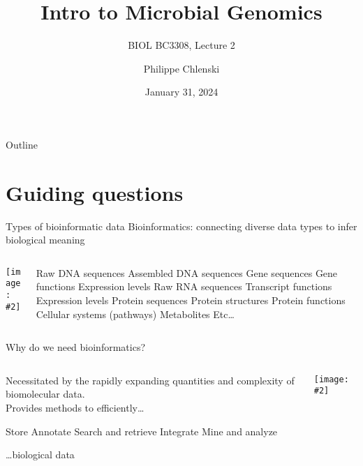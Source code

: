 \documentclass{beamer}
\title{Intro to Microbial Genomics}
\subtitle{BIOL BC3308, Lecture 2}
\author{Philippe Chlenski}
\date{January 31, 2024}
\renewcommand{\c}[1]{\begin{center}#1\end{center}}
\newcommand{\gr}[2][.95]{\c{\texttt{[image: \#2]}}}
\begin{document}
\begin{frame}[plain]
\titlepage
\end{frame}

\begin{frame}{Outline}
\tableofcontents
\end{frame}

\section{Guiding questions}

\begin{frame}{Types of bioinformatic data}
Bioinformatics: connecting diverse data types to infer biological meaning
\begin{columns}
\begin{column}{0.5\textwidth}
    \gr{l2_figs/s3_evolve.png}
\end{column}
\begin{column}{0.5\textwidth}
    \tiny
    \begin{outline}
        \1 Raw DNA sequences
        \1 Assembled DNA sequences
        \1 Gene sequences
        \1 Gene functions
        \1 Expression levels
        \1 Raw RNA sequences
        \1 Transcript functions
        \1 Expression levels
        \1 Protein sequences
        \1 Protein structures
        \1 Protein functions
        \1 Cellular systems (pathways)
        \1 Metabolites
        \1 Etc\ldots
    \end{outline}
\end{column}
\end{columns}
\end{frame}

\begin{frame}{Why do we need bioinformatics?}
\begin{columns}
\begin{column}{0.5\textwidth}
    Necessitated by the rapidly expanding quantities and complexity of biomolecular data.\\
    \bigskip
    Provides methods to efficiently\ldots
    \begin{outline}
        \1 Store
        \1 Annotate
        \1 Search and retrieve
        \1 Integrate
        \1 Mine and analyze
    \end{outline}
    \ldots biological data
\end{column}
\begin{column}{0.5\textwidth}
    \gr{l2_figs/s3_number_genomes.png}
\end{column}
\end{columns}
\end{frame}
\end{document}
